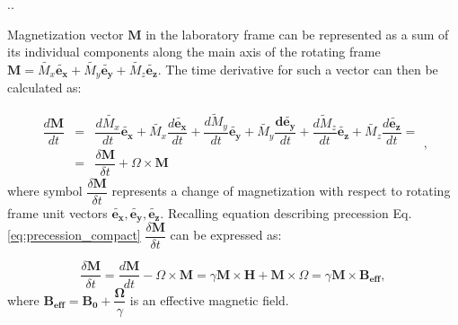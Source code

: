\documentclass{beamer}
\begin{document}
\begin{frame}[shrink=5]{\thesection.\thesubsection. \insertsubsection}

 Magnetization vector $\bm{M}$ in the laboratory frame can be represented as a sum of its individual components along the main axis of the rotating frame $\bm{M} = \tilde{M_x} \bm{\tilde{e_x}} + \tilde{M_y} \bm{\tilde{e_y}}+ \tilde{M_z} \bm{\tilde{e_z}}$.  The time derivative for such a vector can then be calculated as:
 
 \begin{equation}
 \begin{array} {lcl}
 \dfrac{d\bm{M}}{dt} &=& \dfrac{d\tilde{M_x}}{dt} \bm{\tilde{e_x}} + \tilde{M_x} \dfrac{d\bm{\tilde{e_x}}}{dt} + \dfrac{\tilde{dM_y}}{dt} \bm{\tilde{e_y}} + \tilde{M_y} \dfrac{\bm{d\tilde{e_y}}}{dt} + \dfrac{\tilde{dM_z}}{dt} \bm{\tilde{e_z}} + \tilde{M_z} \dfrac{d\bm{\tilde{e_z}}}{dt} = \\
 &=& \dfrac{\delta \bm{M}}{\delta t} + \Omega \times \bm{M}
 \end{array},
 \end{equation}
 where symbol $\dfrac{\delta \bm{M}}{\delta t}$ represents a change of magnetization with respect to rotating frame unit vectors $\bm{\tilde{e_x}}, \bm{\tilde{e_y}}, \bm{\tilde{e_z}}$. Recalling equation describing precession  Eq.\ref{eq:precession_compact}  $\dfrac{\delta \bm{M}}{\delta t}$ can be expressed as:

 \begin{equation}
 \dfrac{\delta \bm{M}}{\delta t} = \dfrac{d\bm{M}}{dt} - \Omega \times \bm{M} = \gamma \bm{M} \times \bm{H} + \bm{M} \times \Omega = \gamma \bm{M} \times \bm{B_{eff}},
 \end{equation}
 where  $\bm {B_{eff}} = \bm{B_0} + \dfrac{\bm {\Omega}}{\gamma}$ is an effective magnetic field. 


\end{frame}
\end{document}
